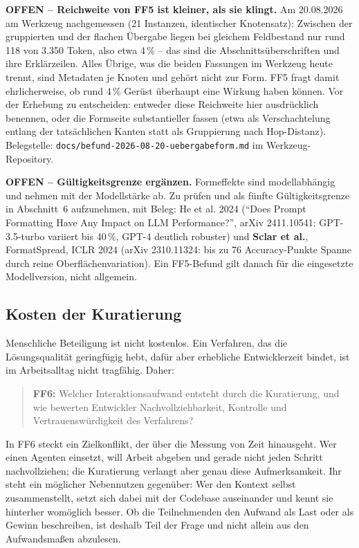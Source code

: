 \begin{offen}
\textbf{OFFEN -- Reichweite von FF5 ist kleiner, als sie klingt.} Am 20.08.2026 am Werkzeug nachgemessen (21 Instanzen, identischer Knotensatz): Zwischen der gruppierten und der flachen Übergabe liegen bei gleichem Feldbestand nur rund 118 von 3.350 Token, also etwa 4\,\% -- das sind die Abschnittsüberschriften und ihre Erklärzeilen. Alles Übrige, was die beiden Fassungen im Werkzeug heute trennt, sind Metadaten je Knoten und gehört nicht zur Form. FF5 fragt damit ehrlicherweise, ob rund 4\,\% Gerüst überhaupt eine Wirkung haben können. Vor der Erhebung zu entscheiden: entweder diese Reichweite hier ausdrücklich benennen, oder die Formseite substantieller fassen (etwa als Verschachtelung entlang der tatsächlichen Kanten statt als Gruppierung nach Hop-Distanz). Belegstelle: \texttt{docs/befund-2026-08-20-uebergabeform.md} im Werkzeug-Repository.

\textbf{OFFEN -- Gültigkeitsgrenze ergänzen.} Formeffekte sind modellabhängig und nehmen mit der Modellstärke ab. Zu prüfen und als fünfte Gültigkeitsgrenze in Abschnitt~6 aufzunehmen, mit Beleg: He et al. 2024 (\enquote{Does Prompt Formatting Have Any Impact on LLM Performance?}, arXiv 2411.10541: GPT-3.5-turbo variiert bis 40\,\%, GPT-4 deutlich robuster) und \textbf{Sclar et al.}, FormatSpread, ICLR 2024 (arXiv 2310.11324: bis zu 76 Accuracy-Punkte Spanne durch reine Oberflächenvariation). Ein FF5-Befund gilt danach für die eingesetzte Modellversion, nicht allgemein.
\end{offen}

\subsection{Kosten der Kuratierung}

Menschliche Beteiligung ist nicht kostenlos. Ein Verfahren, das die Lösungsqualität geringfügig hebt, dafür aber erhebliche Entwicklerzeit bindet, ist im Arbeitsalltag nicht tragfähig. Daher:

\begin{quote}
\textbf{FF6:} Welcher Interaktionsaufwand entsteht durch die Kuratierung, und wie bewerten Entwickler Nachvollziehbarkeit, Kontrolle und Vertrauenswürdigkeit des Verfahrens?
\end{quote}

In FF6 steckt ein Zielkonflikt, der über die Messung von Zeit hinausgeht. Wer einen Agenten einsetzt, will Arbeit abgeben und gerade nicht jeden Schritt nachvollziehen; die Kuratierung verlangt aber genau diese Aufmerksamkeit. Ihr steht ein möglicher Nebennutzen gegenüber: Wer den Kontext selbst zusammenstellt, setzt sich dabei mit der Codebase auseinander und kennt sie hinterher womöglich besser. Ob die Teilnehmenden den Aufwand als Last oder als Gewinn beschreiben, ist deshalb Teil der Frage und nicht allein aus den Aufwandsmaßen abzulesen.

